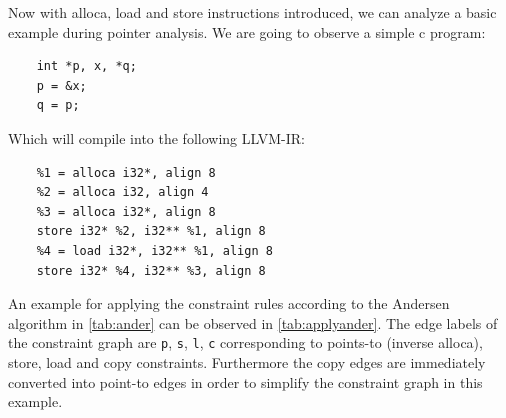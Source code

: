 Now with alloca, load and store instructions introduced, we can analyze a basic example during pointer analysis.
We are going to observe a simple c program:
\begin{verbatim}
    int *p, x, *q;
    p = &x;
    q = p;
\end{verbatim}
Which will compile into the following LLVM-IR:
\begin{verbatim}
    %1 = alloca i32*, align 8
    %2 = alloca i32, align 4
    %3 = alloca i32*, align 8
    store i32* %2, i32** %1, align 8
    %4 = load i32*, i32** %1, align 8
    store i32* %4, i32** %3, align 8
\end{verbatim}
An example for applying the constraint rules according to the Andersen algorithm in \autoref{tab:ander} can be observed in \autoref{tab:applyander}.
The edge labels of the constraint graph are \verb|p|, \verb|s|, \verb|l|, \verb|c| corresponding to points-to (inverse alloca), store, load and copy constraints.
Furthermore the copy edges are immediately converted into point-to edges in order to simplify the constraint graph in this example.

